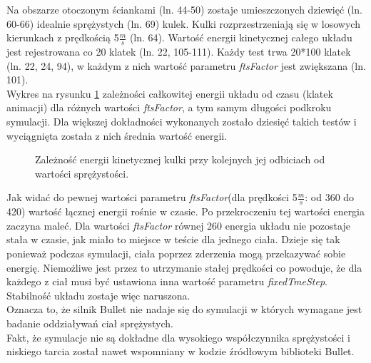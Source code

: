 Na obszarze otoczonym ściankami (ln. 44-50) zostaje umieszczonych dziewięć (ln.
60-66) idealnie sprężystych (ln. 69) kulek. Kulki rozprzestrzeniają się w
losowych kierunkach z prędkością 5$ \frac{m}{s} $ (ln. 64). Wartość energii
kinetycznej całego układu jest rejestrowana co 20 klatek (ln. 22, 105-111).
Każdy test trwa 20*100 klatek (ln. 22, 24, 94), w każdym z nich wartość
parametru \emph{ftsFactor} jest zwiększana (ln. 101).\\
Wykres na rysunku \ref{fig:EKwieleCial} zależności całkowitej energii układu od
czasu (klatek animacji) dla różnych wartości \emph{ftsFactor}, a tym samym
długości podkroku symulacji. Dla większej dokładności wykonanych zostało
dziesięć takich testów i wyciągnięta została z nich średnia wartość energii.

\begin{figure}[H]

\caption{Zależność energii kinetycznej kulki przy kolejnych jej odbiciach od wartości
sprężystości.}
\label{fig:EKwieleCial}
\end{figure}

Jak widać do pewnej wartości parametru \emph{ftsFactor}(dla prędkości 5$
\frac{m}{s} $: od 360 do 420) wartość łącznej energii rośnie w czasie. Po
przekroczeniu tej wartości energia zaczyna maleć. Dla wartości \emph{ftsFactor}
równej 260 energia układu nie pozostaje stała w czasie, jak miało to miejsce w
teście dla jednego ciała. Dzieje się tak ponieważ podczas symulacji, ciała
poprzez zderzenia mogą przekazywać sobie energię. Niemożliwe jest przez to
utrzymanie stałej prędkości co powoduje, że dla każdego z ciał musi być
ustawiona inna wartość parametru \emph{fixedTmeStep}. Stabilność układu zostaje
więc naruszona.\\
Oznacza to, że silnik Bullet nie nadaje się do symulacji w których wymagane jest
badanie oddziaływań ciał sprężystych.\\
Fakt, że symulacje nie są dokładne dla wysokiego współczynnika sprężystości i
niskiego tarcia został nawet wspomniany w kodzie źródłowym biblioteki Bullet.





